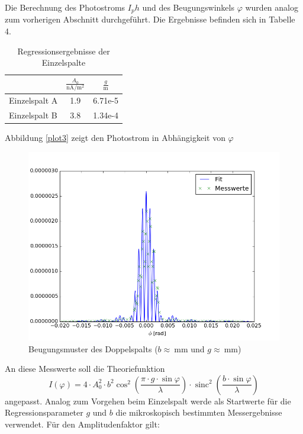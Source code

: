 \documentclass[11pt,ngerman,a4paper]{article}
\begin{document}
Die Berechnung des Photostroms $I_ph$ und des Beugungswinkels $\varphi$ wurden analog zum vorherigen Abschnitt durchgeführt. Die Ergebnisse befinden sich in Tabelle 4.
\begin{table}[H]
\centering
\begin{tabular}{lSS}

\toprule
&$\frac{A_0}{\si{\nano\ampere\per\meter\squared}}$ &$\frac{g}{\si{\meter}}$\\
\midrule
Einzelspalt A & 1.9  &6.71e-5 \\
Einzelspalt B & 3.8  &1.34e-4 \\
\bottomrule
\end{tabular}
\caption{Regressionsergebnisse der Einzelspalte}
\end{table}
 Abbildung \ref{plot3} zeigt den Photostrom in Abhängigkeit von $\varphi$ 
\begin{figure}[H]
\centering
\includegraphics[scale=0.8]{plot2.png}
\caption{Beugungsmuster des Doppelspalts ($b \approx \SI{}{\milli\meter}$ und $g\approx \SI{}{\milli\meter} $)}
\label{plot0}
\end{figure} 
An diese Messwerte soll die Theoriefunktion
\begin{equation}
I(\varphi) = 4 \cdot A_0^2\cdot b^2\cos^2\left(\frac{\pi\cdot g \cdot \sin \varphi}{\lambda}\right)\cdot \operatorname{sinc}^2\left( \frac{b\cdot\sin{\varphi}}{\lambda}\right) 
\end{equation}
angepasst. Analog zum Vorgehen beim Einzelspalt werde als Startwerte für die Regressionsparameter $g$ und $b$ die mikroskopisch bestimmten Messergebnisse verwendet. Für den Amplitudenfaktor gilt:
\end{document}

